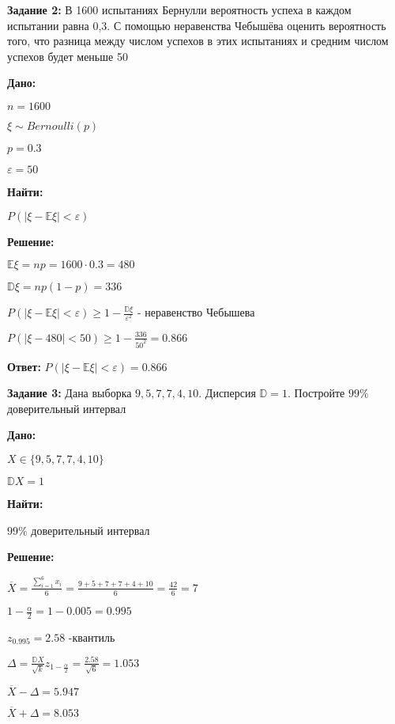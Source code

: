 {}\documentclass{article}
\begin{document}
\newpage

    \textbf{Задание 2:}
    В 1600 испытаниях Бернулли вероятность успеха в каждом испытании равна 0,3.
    С помощью неравенства Чебышёва оценить вероятность того, что разница между
    числом успехов в этих испытаниях и средним числом успехов будет меньше 50

    \textbf{Дано:}

    $n = 1600$

    $\xi \sim Bernoulli(p)$

    $p = 0.3$

    $\varepsilon = 50$

    \textbf{Найти:}

    $P(|\xi - \mathbb E {\xi}| < \varepsilon)$

    \textbf{Решение:}

    $\mathbb{E} \xi  = np = 1600 \cdot 0.3 = 480$

    $\mathbb{D} \xi = np(1-p) = 336$

    $P(|\xi - \mathbb{E}\xi| < \varepsilon) \geq 1 - \frac{\mathbb{D}\xi}{\varepsilon^2}$ - неравенство Чебышева

    $P(|\xi - 480| < 50) \geq 1 - \frac{336}{50^2} = 0.866$

    \textbf{Ответ:} $P(|\xi - \mathbb{E}\xi| < \varepsilon) = 0.866$

\newpage

    \textbf{Задание 3:}
    Дана выборка $9, 5, 7, 7, 4, 10$.
    Дисперсия $\mathbb{D} = 1$.
    Постройте $99 \%$ доверительный интервал

    \textbf{Дано:}

    $X \in \{9, 5, 7, 7, 4, 10\}$

    $\mathbb{D}X = 1$

    \textbf{Найти:}

    $99 \%$ доверительный интервал

    \textbf{Решение:}

    $\overline{X} = \frac{\sum_{i=1}^6 x_i}{6} = \frac{9+5+7+7+4+10}{6} = \frac{42}{6} = 7$

    $ 1 - \frac{\alpha}{2} = 1 - 0.005 = 0.995$

    $z_{0.995} = 2.58$ -квантиль

    $\Delta = \frac{\mathbb{D}X}{\sqrt{k}}z_{1 - \frac{\alpha}{2}} = \frac{2.58}{\sqrt{6}} = 1.053$

    $\overline{X} - \Delta = 5.947$

    $\overline{X} + \Delta = 8.053$
\end{document}
